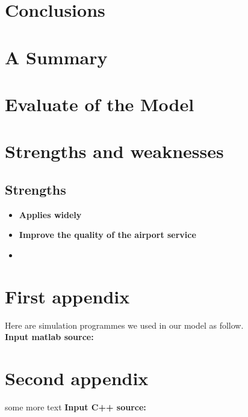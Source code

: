 \documentclass{mcmthesis}
\begin{document}
\section{Conclusions}

\section{A Summary}


\section{Evaluate of the Model}

\section{Strengths and weaknesses}


\subsection{Strengths}
\begin{itemize}
\item \textbf{Applies widely}\\

\item \textbf{Improve the quality of the airport service}\\

\item \textbf{}\\
\end{itemize}


\begin{appendices}

\section{First appendix}


Here are simulation programmes we used in our model as follow.\\

\textbf{\textcolor[rgb]{0.98,0.00,0.00}{Input matlab source:}}


\section{Second appendix}

some more text \textcolor[rgb]{0.98,0.00,0.00}{\textbf{Input C++ source:}}


\end{appendices}

	\nocite{*}



	
\end{document}
